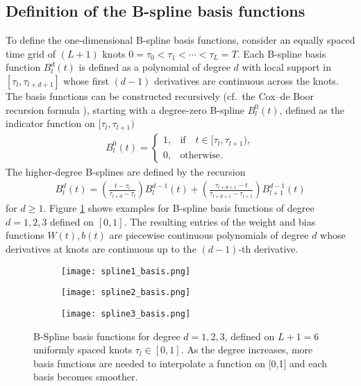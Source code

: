 \documentclass[12pt]{amsart}
\begin{document}
  \subsection{Definition of the B-spline basis functions}\label{sec:bspline_definition}
  To define the one-dimensional B-spline basis functions, consider an equally spaced time grid of $(L+1)$ knots $0=\tau_0<\tau_1<\cdots<\tau_L=T$.
  Each B-spline basis function $B^d_l(t)$ is defined as a polynomial of degree $d$ with local support in $[\tau_l,\tau_{l+d+1}]$ whose first $(d-1)$ derivatives are continuous across the knots.
  The basis functions can be constructed recursively (cf.\ the Cox–de Boor recursion formula \cite{kincaid2009numerical}), starting with a degree-zero B-spline $B^0_l(t)$, defined as the indicator function on $[\tau_l,\tau_{l+1})$
    \begin{align}
         B^0_l(t) = \begin{cases}
           1, & \text{if} \quad t\in[\tau_l,\tau_{l+1}), \\
           0, & \text{otherwise}.
        \end{cases}
    \end{align}
    The higher-degree B-splines are defined by the recursion
    \begin{align} \label{eq:recursive_bspline}
           B^d_l(t) = \left(\frac{t-\tau_l}{\tau_{l+d}-\tau_l}\right) B^{d-1}_l(t) +
                   \left(\frac{\tau_{l+d+1}-t}{\tau_{l+d+1}-\tau_{l+1}}\right) B^{d-1}_{l+1}(t)
     \end{align}
    for $d \geq 1$.
    Figure \ref{fig:spline_basis} shows examples for B-spline basis functions of degree $d=1,2,3$ defined on $[0,1]$.
The resulting entries of the weight and bias functions $W(t), b(t)$ are piecewise continuous polynomials of degree $d$ whose derivatives at knots are continuous up to the $(d-1)$-th derivative.


 \begin{figure}[!htb]
    \centering
    \begin{subfigure}[b]{0.32\textwidth}
        \centering
        \texttt{[image: spline1\_basis.png]}
    \end{subfigure}
    \begin{subfigure}[b]{0.32\textwidth}
        \centering
        \texttt{[image: spline2\_basis.png]}
    \end{subfigure}
    \begin{subfigure}[b]{0.32\textwidth}
        \centering
        \texttt{[image: spline3\_basis.png]}
    \end{subfigure}
    \caption{B-Spline basis functions for degree $d = 1,2,3$, defined on $L+1=6$ uniformly spaced knots $\tau_l \in [0,1]$. As the degree increases, more basis functions are needed to interpolate a function on [0,1] and each basis becomes smoother.}
    \label{fig:spline_basis}
\end{figure}
\end{document}
